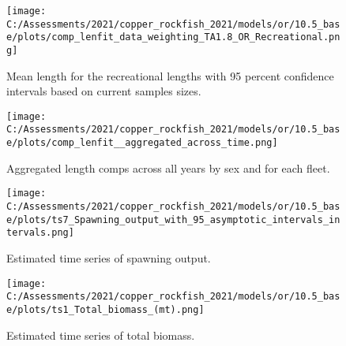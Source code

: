 \documentclass[11pt,
  english,
  a4paper,
]{article}
\begin{document}
\tagmcend\tagstructend


\begin{figure}
\centering
\texttt{[image: C:/Assessments/2021/copper\_rockfish\_2021/models/or/10.5\_base/plots/comp\_lenfit\_data\_weighting\_TA1.8\_OR\_Recreational.png]}
\caption{Mean length for the recreational lengths with 95 percent confidence intervals based on current samples sizes.\label{fig:rec-mean-len-fit}}
\end{figure}

\tagmcend\tagstructend


\begin{figure}
\centering
\texttt{[image: C:/Assessments/2021/copper\_rockfish\_2021/models/or/10.5\_base/plots/comp\_lenfit\_\_aggregated\_across\_time.png]}
\caption{Aggregated length comps across all years by sex and for each fleet.\label{fig:agg-len-fit}}
\end{figure}

\tagmcend\tagstructend


\begin{figure}
\centering
\texttt{[image: C:/Assessments/2021/copper\_rockfish\_2021/models/or/10.5\_base/plots/ts7\_Spawning\_output\_with\_95\_asymptotic\_intervals\_intervals.png]}
\caption{Estimated time series of spawning output.\label{fig:ssb}}
\end{figure}

\tagmcend\tagstructend

\clearpage


\begin{figure}
\centering
\texttt{[image: C:/Assessments/2021/copper\_rockfish\_2021/models/or/10.5\_base/plots/ts1\_Total\_biomass\_(mt).png]}
\caption{Estimated time series of total biomass.\label{fig:tot-bio}}
\end{figure}

\tagmcend\tagstructend

\clearpage

\end{document}
